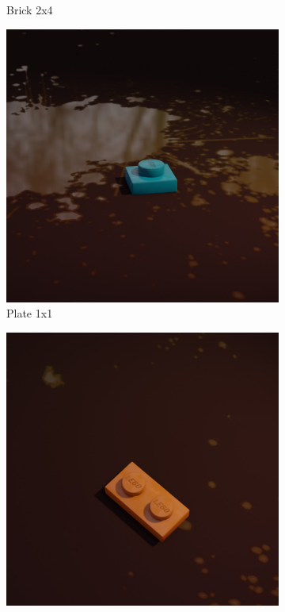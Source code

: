 \documentclass[]{article}
\begin{document}
\begin{figure}[h]
\begin{subfigure}[b]{0.15\textwidth}
        \caption{Brick 2x4}
    \end{subfigure}
    \begin{subfigure}[b]{0.15\textwidth}
        \centering
        \includegraphics[width=\textwidth]{Examples/plate-1x1.jpg}
        \caption{Plate 1x1}
    \end{subfigure}\par\medskip
    \begin{subfigure}[b]{0.15\textwidth}
        \centering
        \includegraphics[width=\textwidth]{Examples/plate-1x2.jpg}

\end{subfigure}
\end{figure}
\end{document}
